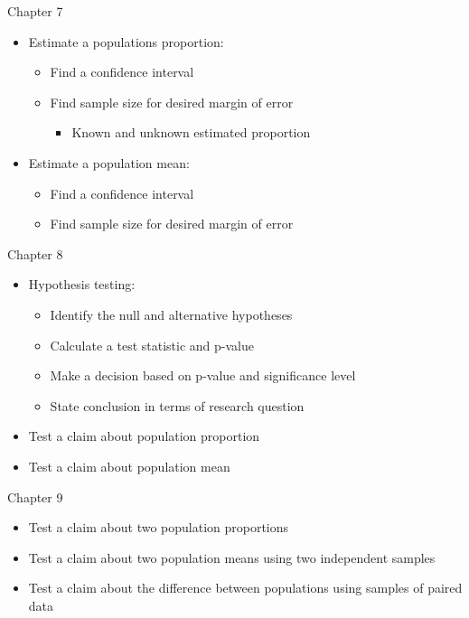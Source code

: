 \documentclass[xcolor=table]{beamer}
\begin{document}
\begin{frame}{Chapter 7}
\begin{block}{}
\begin{itemize}
\item Estimate a populations proportion:
\begin{itemize}
\item Find a confidence interval 
\item Find sample size for desired margin of error
\begin{itemize}
\item Known and unknown estimated proportion
\end{itemize}
\end{itemize}
\item Estimate a population mean:
\begin{itemize}
\item Find a confidence interval 
\item Find sample size for desired margin of error
\end{itemize}
\end{itemize}
\end{block}
\end{frame}

\begin{frame}{Chapter 8}
\begin{block}{}
\begin{itemize}
\item Hypothesis testing:
\begin{itemize}
\item Identify the null and alternative hypotheses
\item Calculate a test statistic and p-value
\item Make a decision based on p-value and significance level
\item State conclusion in terms of research question
\end{itemize}
\item Test a claim about population proportion
\item Test a claim about population mean
\end{itemize}
\end{block}
\end{frame}

\begin{frame}{Chapter 9}
\begin{block}{}
\begin{itemize}
\item Test a claim about two population proportions
\item Test a claim about two population means using two independent samples
\item Test a claim about the difference between populations using samples of paired data
\end{itemize}
\end{block}
\end{frame}
\end{document}
